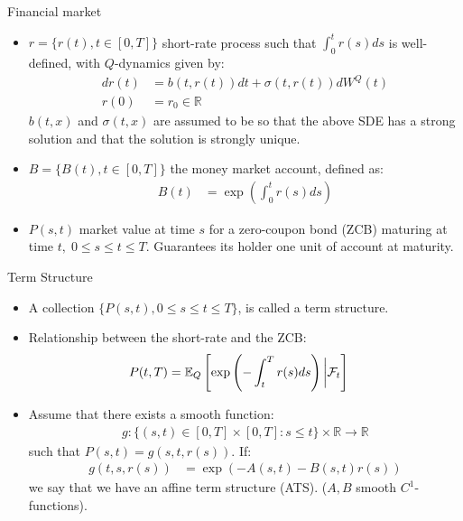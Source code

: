 \documentclass[UKenglish]{beamer}
\newcommand{\E}{\mathbb{E}}  %
\newcommand{\F}{\mathcal{F}} %
\newcommand{\R}{\mathbb{R}}  %
\begin{document}
\begin{frame}{Financial market}
\begin{itemize}
    \item $r = \{r(t), t\in [0,T]\}$ short-rate process such that $\int_{0}^{t}r(s)ds$ is well-defined, with $Q$-dynamics given by: 
    \begin{align*}
    dr(t) &= b(t,r(t))dt + \sigma(t,r(t))dW^{Q}(t)  \\
    r(0) &= r_{0} \in \R
    \end{align*}
    $b(t,x)$ and $\sigma(t,x)$ are assumed to be so  
    that the above SDE has a strong solution and that the solution is strongly unique.  
    \item $B = \{B(t), t\in [0,T]\}$ the money market account, defined as: 
    \begin{align*}
        B(t) &= \exp\left(
        \int_{0}^{t}r(s)ds
        \right)
    \end{align*}
    \item $P(s,t)$ market value at time $s$ for a zero-coupon bond (ZCB) maturing at time $t,\; 0\leq s\leq t \leq T$. Guarantees its holder one unit of account at maturity. 
\end{itemize}
\end{frame}

\begin{frame}{Term Structure}
    \begin{itemize}
        \item A collection $\{P(s,t), 0\leq s \leq t \leq T\}$,  is called a term structure.
        \item Relationship between the short-rate and the ZCB:
        \begin{align*}
        P(t,T) &= \E_{Q}\left[
        \exp\left(
        -\int_{t}^{T}r(s)ds
        \right)\bigg{|}\F_{t}
        \right]    
        \end{align*}
    \item Assume that there exists a smooth function: 
    \begin{align*}
        g:\{(s,t)\in [0,T]\times [0,T]: s\leq t\}\times \R \to \R
    \end{align*}
    such that $P(s,t) = g(s,t,r(s))$. If: 
    \begin{align*}
    g(t,s,r(s)) &= \exp\left(
    -A(s,t)-B(s,t)r(s)
    \right)    
    \end{align*}
    we say that we have an affine term structure (ATS). ($A,B$ smooth $C^{1}$-functions).  
    \end{itemize}
\end{frame}
\end{document}

